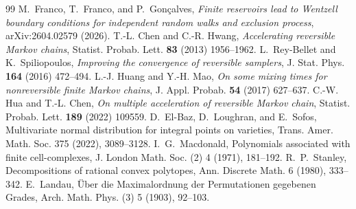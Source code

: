 \documentclass[11pt]{article}
\theoremstyle{definition}
\begin{document}
\begin{thebibliography}{99}
 M.~Franco, T.~Franco, and P.~Gon\c calves, \emph{Finite reservoirs lead to Wentzell boundary conditions for independent random walks and exclusion process}, arXiv:2604.02579 (2026).
 T.-L. Chen and C.-R. Hwang, \emph{Accelerating reversible Markov chains}, Statist. Probab. Lett. \textbf{83} (2013) 1956--1962.
 L.~Rey-Bellet and K.~Spiliopoulos, \emph{Improving the convergence of reversible samplers}, J. Stat. Phys. \textbf{164} (2016) 472--494.
 L.-J. Huang and Y.-H. Mao, \emph{On some mixing times for nonreversible finite Markov chains}, J. Appl. Probab. \textbf{54} (2017) 627--637.
 C.-W. Hua and T.-L. Chen, \emph{On multiple acceleration of reversible Markov chain}, Statist. Probab. Lett. \textbf{189} (2022) 109559.
 D.~El-Baz, D.~Loughran, and E.~Sofos, Multivariate normal distribution for integral points on varieties, Trans. Amer. Math. Soc. 375 (2022), 3089--3128.
 I.~G.~Macdonald, Polynomials associated with finite cell-complexes, J. London Math. Soc. (2) 4 (1971), 181--192.
 R.~P.~Stanley, Decompositions of rational convex polytopes, Ann. Discrete Math. 6 (1980), 333--342.
 E.~Landau, \"Uber die Maximalordnung der Permutationen gegebenen Grades, Arch. Math. Phys. (3) 5 (1903), 92--103.



\end{thebibliography}
\end{document}
